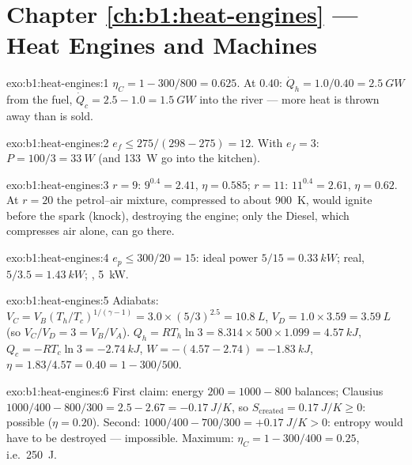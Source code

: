 \section*{Chapter \ref{ch:b1:heat-engines} --- Heat Engines and Machines}

\begin{solution}{exo:b1:heat-engines:1}
$\eta_C = 1 - 300/800 = 0.625$. At $0.40$: $\dot Q_h = 1.0/0.40 = \qty{2.5}{GW}$
from the fuel, $\dot Q_c = 2.5 - 1.0 = \qty{1.5}{GW}$ into the river --- more
heat is thrown away than is sold.
\end{solution}

\begin{solution}{exo:b1:heat-engines:2}
$e_f \leq 275/(298 - 275) = 12$. With $e_f = 3$: $P = 100/3 = \qty{33}{W}$
(and \qty{133}{W} go into the kitchen).
\end{solution}

\begin{solution}{exo:b1:heat-engines:3}
$r = 9$: $9^{0.4} = 2.41$, $\eta = 0.585$; $r = 11$: $11^{0.4} = 2.61$,
$\eta = 0.62$. At $r = 20$ the petrol--air mixture, compressed to about
\qty{900}{K}, would ignite before the spark (knock), destroying the
engine; only the Diesel, which compresses air alone, can go there.
\end{solution}

\begin{solution}{exo:b1:heat-engines:4}
$e_p \leq 300/20 = 15$: ideal power $5/15 = \qty{0.33}{kW}$; real, $5/3.5 =
\qty{1.43}{kW}$; , \qty{5}{kW}.
\end{solution}

\begin{solution}{exo:b1:heat-engines:5}
Adiabats: $V_C = V_B(T_h/T_c)^{1/(\gamma-1)} = 3.0 \times (5/3)^{2.5} =
\qty{10.8}{L}$, $V_D = 1.0 \times 3.59 = \qty{3.59}{L}$ (so $V_C/V_D = 3 =
V_B/V_A$). $Q_h = RT_h\ln3 = 8.314 \times 500 \times 1.099 = \qty{4.57}{kJ}$,
$Q_c = -RT_c\ln3 = \qty{-2.74}{kJ}$, $W = -(4.57 - 2.74) = \qty{-1.83}{kJ}$,
$\eta = 1.83/4.57 = 0.40 = 1 - 300/500$.
\end{solution}

\begin{solution}{exo:b1:heat-engines:6}
First claim: energy $200 = 1000 - 800$ balances; Clausius $1000/400 - 800/300
= 2.5 - 2.67 = \qty{-0.17}{J/K}$, so $S_{\mathrm{created}} = \qty{0.17}{J/K} \geq 0$:
possible ($\eta = 0.20$). Second: $1000/400 - 700/300 = +\qty{0.17}{J/K} > 0$:
entropy would have to be destroyed --- impossible. Maximum: $\eta_C = 1 -
300/400 = 0.25$, i.e.\ \qty{250}{J}.
\end{solution}


